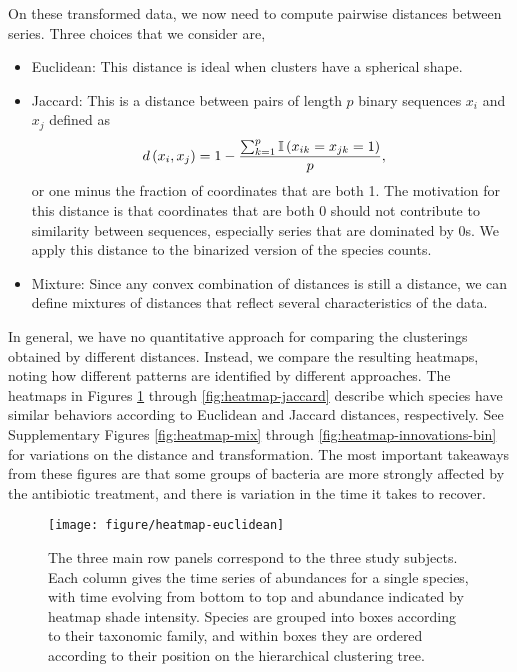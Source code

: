 \documentclass[14pt]{extarticle}
\begin{document}
On these transformed data, we now need to compute pairwise distances between
series. Three choices that we consider are,
\begin{itemize}
\item Euclidean: This distance is ideal when clusters have a spherical shape.
\item Jaccard: This is a distance between pairs of length $p$ binary sequences
  $x_{i}$ and $x_{j}$ defined as
\begin{align*}
  d\left(x_{i}, x_{j}\right) &= 1 - \frac{\sum_{k = 1}^{p} \mathbb{I}\left({x_{ik} = x_{jk} = 1}\right)}{p},
\end{align*}
or one minus the fraction of coordinates that are both 1. The motivation for this
distance is that coordinates that are both 0 should not contribute to similarity
between sequences, especially series that are dominated by 0s. We apply this
distance to the binarized version of the species counts.
\item Mixture: Since any convex combination of distances is still a distance, we
  can define mixtures of distances that reflect several characteristics of the
  data.
\end{itemize}

In general, we have no quantitative approach for comparing the clusterings
obtained by different distances. Instead, we compare the resulting heatmaps,
noting how different patterns are identified by different approaches. The
heatmaps in Figures \ref{fig:heatmap-euclidean} through
\ref{fig:heatmap-jaccard} describe which species have similar behaviors
according to Euclidean and Jaccard distances, respectively. See Supplementary
Figures \ref{fig:heatmap-mix} through \ref{fig:heatmap-innovations-bin} for
variations on the distance and transformation. The most important takeaways from
these figures are that some groups of bacteria are more strongly affected by the
antibiotic treatment, and there is variation in the time it takes to recover.

\begin{figure}
  \centering
  \texttt{[image: figure/heatmap-euclidean]}
  \caption{The three main row panels correspond to the three study subjects.
    Each column gives the time series of abundances for a single species, with
    time evolving from bottom to top and abundance indicated by heatmap shade
    intensity. Species are grouped into boxes according to their taxonomic
    family, and within boxes they are ordered according to their position on the
    hierarchical clustering tree.
    \label{fig:heatmap-euclidean} }
\end{figure}
\end{document}

